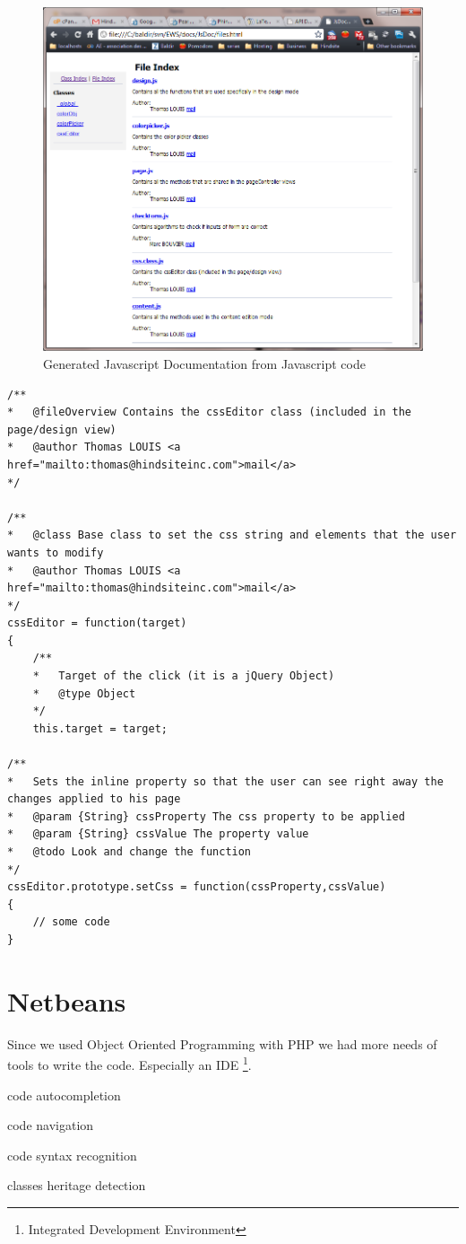 \begin{figure}[!ht]
\centering
\includegraphics[width=.55\textwidth]{img/jsdoc.png}
\caption{Generated Javascript Documentation from Javascript code}
\label{figure:jsdoc-web}
\end{figure}

\lstset{language=Javascript}
\begin{lstlisting}[label=jsdoc-code,caption=Javascript documentation in a Javascript class]
/**
*	@fileOverview Contains the cssEditor class (included in the page/design view)
*	@author Thomas LOUIS <a href="mailto:thomas@hindsiteinc.com">mail</a>
*/

/**
*	@class Base class to set the css string and elements that the user wants to modify
*	@author Thomas LOUIS <a href="mailto:thomas@hindsiteinc.com">mail</a>
*/
cssEditor = function(target)
{
	/**
	*	Target of the click (it is a jQuery Object)
	*	@type Object
	*/
	this.target = target;

/**
*	Sets the inline property so that the user can see right away the changes applied to his page
*	@param {String} cssProperty The css property to be applied
*	@param {String} cssValue The property value
*	@todo Look and change the function
*/
cssEditor.prototype.setCss = function(cssProperty,cssValue)
{
	// some code		
}

\end{lstlisting}

\section{Netbeans}

Since we used Object Oriented Programming with PHP we had more needs of tools 
to write the code. Especially an IDE \footnote{Integrated Development Environment}.

\begin{itemize*}
\item code autocompletion
\item code navigation
\item code syntax recognition
\item classes heritage detection
\end{itemize*}


